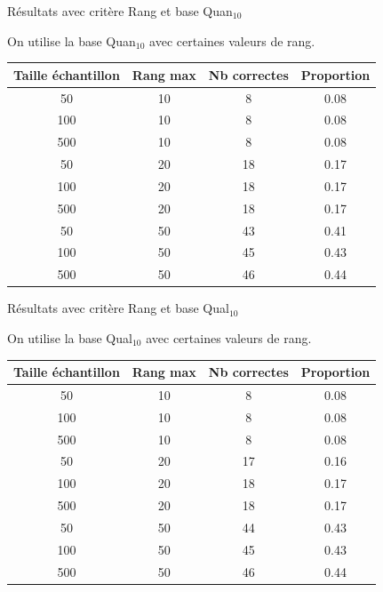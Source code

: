 \documentclass{beamer}
\begin{document}
\begin{frame}{Résultats avec critère Rang et base Quan$_{10}$}

On utilise la base Quan$_{10}$ avec certaines valeurs de rang.
\begin{tabular}{|c|c|c|c|}
   \hline
   Taille échantillon & Rang max & Nb correctes & Proportion\\
   \hline
   50 & 10  & 8 & 0.08  \\
   \hline
   100 & 10  & 8 & 0.08  \\
   \hline
   500 & 10  & 8 & 0.08  \\
   \hline
   \hline
   50 & 20 & 18 & 0.17  \\
   \hline
   100 & 20 & 18 & 0.17  \\
   \hline
   500 & 20 & 18 & 0.17  \\
   \hline
   \hline
   50 & 50 & 43 & 0.41  \\
   \hline
   100 & 50 & 45 & 0.43  \\
   \hline
   500 & 50 & 46 & 0.44  \\
   \hline
\end{tabular}

\end{frame}

\begin{frame}{Résultats avec critère Rang et base Qual$_{10}$}

On utilise la base Qual$_{10}$ avec certaines valeurs de rang.
\begin{tabular}{|c|c|c|c|}
   \hline
   Taille échantillon & Rang max & Nb correctes & Proportion\\
   \hline
   50 & 10  & 8 & 0.08  \\
   \hline
   100 & 10  & 8 & 0.08  \\
   \hline
   500 & 10  & 8 & 0.08  \\
   \hline
   \hline
   50 & 20  & 17 & 0.16  \\
   \hline
   100 & 20 & 18 & 0.17  \\
   \hline
   500 & 20 & 18 & 0.17  \\
   \hline
   \hline
   50 & 50 & 44 & 0.43  \\
   \hline
   100 & 50 & 45 & 0.43  \\
   \hline
   500 & 50 & 46 & 0.44  \\
   \hline
\end{tabular}
\end{frame}
\end{document}
